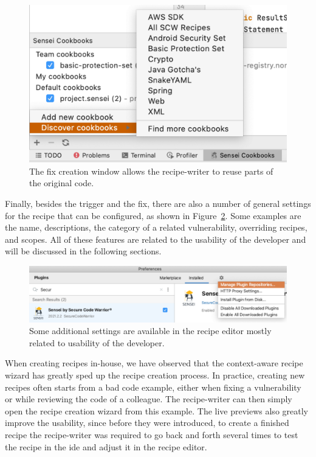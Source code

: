 \begin{figure}
  \centering
  \includegraphics[width=\textwidth,page=5]{04-tools/figures/figures1.pdf}
  \caption[Fix creation window]{The fix creation window allows the recipe-writer to reuse parts of the original code.}
  \label{fig:createfix} 
\end{figure}

Finally, besides the trigger and the fix, there are also a number of general settings for the recipe that can be configured, as shown in Figure~\ref{fig:generalsettings}.
Some examples are the name, descriptions, the category of a related vulnerability, overriding recipes, and scopes.
All of these features are related to the usability of the developer and will be discussed in the following sections.

\begin{figure}
  \centering
  \includegraphics[width=\textwidth,page=8]{04-tools/figures/figures2.pdf}
  \caption[General recipe settings]{Some additional settings are available in the recipe editor mostly related to usability of the developer.}
  \label{fig:generalsettings} 
\end{figure}

When creating recipes in-house, we have observed that the context-aware recipe wizard has greatly sped up the recipe creation process.
In practice, creating new recipes often starts from a bad code example, either when fixing a vulnerability or while reviewing the code of a colleague.
The recipe-writer can then simply open the recipe creation wizard from this example.
The live previews also greatly improve the usability, since before they were introduced, to create a finished recipe the recipe-writer was required to go back and forth several times to test the recipe in the \gls{ide} and adjust it in the recipe editor.



